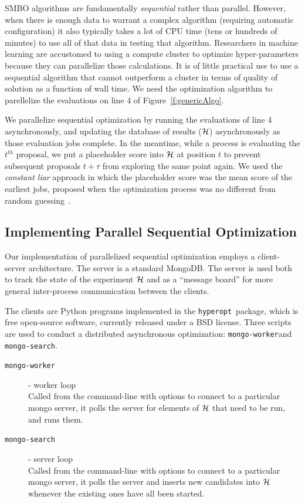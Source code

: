 \documentclass{article}
\newcommand{\hyperopt}{{\tt hyperopt}}
\newcommand{\mongoworker}{{\tt mongo-worker}}
\newcommand{\mongosearch}{{\tt mongo-search}}
\begin{document}
SMBO algorithms are fundamentally {\em sequential} rather than parallel.
However, when there is enough data to warrant a complex algorithm (requiring automatic configuration)
it also typically takes a lot of CPU time (tens or hundreds of minutes) to use all of that data in testing that algorithm.
Researchers in machine learning are accustomed to using a compute cluster
to optimize hyper-parameters because they can parallelize those calculations.
It is of little practical use to use a sequential algorithm that cannot outperform a cluster
in terms of quality of solution as a function of wall time.
We need the optimization algorithm to parellelize the evaluations on line 4 of
Figure~\ref{f:genericAlgo}.

We parallelize sequential optimization by running the evaluations of line 4 asynchronously,
and updating the database of results (${\cal H}$) asynchronously as those evaluation jobs complete.
In the meantime, while a process is evaluating the $t^{th}$ proposal,
we put a placeholder score into ${\cal H}$ at position $t$ to prevent subsequent proposals $t+\tau$
from exploring the same point again.
We used the {\em constant liar} approach in which the placeholder score was the mean score of the earliest jobs,
proposed when the optimization process was no different from random guessing~\cite{ginsbourger+leriche+carraro:2010}.


\subsection{Implementing Parallel Sequential Optimization}

Our implementation of parallelized sequential optimization employs a client-server architecture.
The server is a standard MongoDB.
The server is used both to track the state of the experiment ${\cal H}$ and as a
``message board'' for more general inter-process communication between the clients.

The clients are Python programs implemented in the \hyperopt\ package, which is
free open-source software, currently released under a BSD license. Three scripts are used
to conduct a distributed asynchronous optimization: \mongoworker and \mongosearch.

\begin{description}
\item[\mongoworker] - worker loop\\
    Called from the command-line with options to connect to a particular mongo server,
    it polls the server for elements of ${\cal H}$ that need to be run, and runs them.
\item[\mongosearch] - server loop\\
    Called from the command-line with options to connect to a particular mongo server,
    it polls the server and inserts new candidates into ${\cal H}$ whenever the existing ones have all been started.
\end{description}
\end{document}
